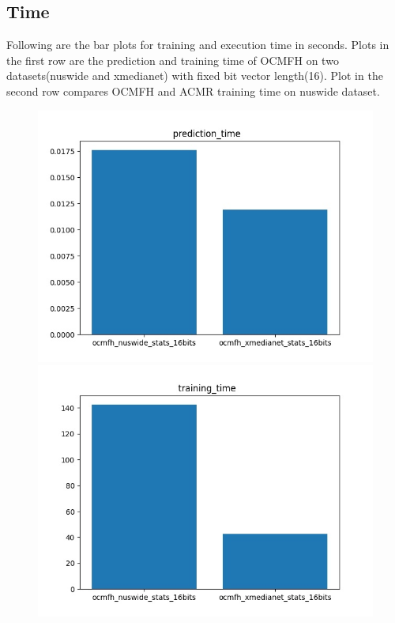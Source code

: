 \subsection{Time}
    Following are the bar plots for training and execution time in seconds. Plots in the first row are the prediction and training time of OCMFH\cite{ocmfh} on two datasets(nuswide and xmedianet) with fixed bit vector length(16). Plot in the second row compares OCMFH\cite{ocmfh} and ACMR training time on nuswide dataset.
        \begin{figure}[H]
            \begin{minipage}[!h]{0.6\linewidth}
                \centering
                \includegraphics[width=\linewidth]{resultsImages/time/prediction_time_ocmfh_both.jpeg}
                \vspace{0.1ex}
                \hspace{0.1ex}
            \end{minipage}
            \begin{minipage}[!h]{0.6\linewidth}
                \centering
                \includegraphics[width=\linewidth]{resultsImages/time/training_time_ocmfh_both.jpeg}

\end{minipage}
\end{figure}
